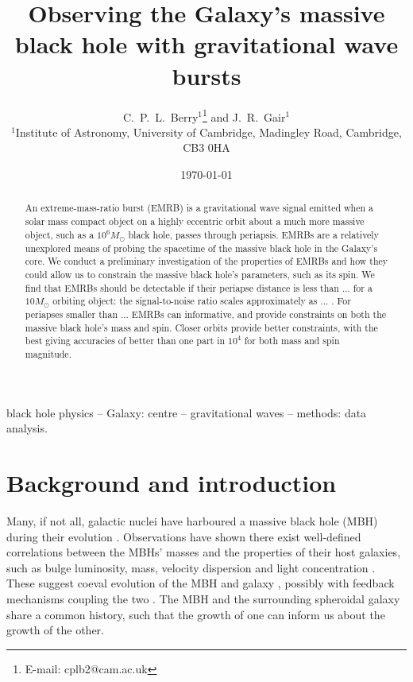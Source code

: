 \documentclass[useAMS,usedcolumn,usegraphicx,usenatbib]{mn2e}
\title[Observing the Galaxy's MBH with GW bursts]{Observing the Galaxy's massive black hole with gravitational wave bursts}
\author[C.\ P.\ L.\ Berry and J.\ R.\ Gair]{C.\ P.\ L.\ Berry$^{1}$\thanks{E-mail: cplb2@cam.ac.uk}  and J.\ R.\ Gair$^{1}$\\
$^{1}$Institute of Astronomy, University of Cambridge, Madingley Road, Cambridge, CB3 0HA}
\begin{document}
\date{\today}

\pagerange{\pageref{firstpage}--\pageref{lastpage}} 

\maketitle

\label{firstpage}

\begin{abstract}
An extreme-mass-ratio burst (EMRB) is a gravitational wave signal emitted when a solar mass compact object on a highly eccentric orbit about a much more massive object, such as a $10^6 M_\odot$ black hole, passes through periapsis. EMRBs are a relatively unexplored means of probing the spacetime of the massive black hole in the Galaxy's core. We conduct a preliminary investigation of the properties of EMRBs and how they could allow us to constrain the massive black hole's parameters, such as its spin. We find that EMRBs should be detectable if their periapse distance is less than ... for a $10 M_\odot$ orbiting object: the signal-to-noise ratio scales approximately as ... . For periapses smaller than ... EMRBs can informative, and provide constraints on both the massive black hole's mass and spin. Closer orbits provide better constraints, with the best giving accuracies of better than one part in $10^4$ for both mass and spin magnitude.
\end{abstract}

\begin{keywords}
black hole physics -- Galaxy: centre -- gravitational waves -- methods: data analysis.
\end{keywords}

\section{Background and introduction}\label{sec:Intro}

Many, if not all, galactic nuclei have harboured a massive black hole (MBH) during their evolution \citep{Lynden-Bell1971, Soltan1982, Rees1984}. Observations have shown there exist well-defined correlations between the MBHs' masses and the properties of their host galaxies, such as bulge luminosity, mass, velocity dispersion and light concentration \citep{Kormendy1995, Magorrian1998, Ferrarese2000, Gebhardt2000, Graham2001, Tremaine2002, Marconi2003, Haring2004, Graham2007, Graham2011}. These suggest coeval evolution of the MBH and galaxy \citep{Peng2007, Jahnke2011}, possibly with feedback mechanisms coupling the two \citep{Haiman2004, Volonteri2009}. The MBH and the surrounding spheroidal galaxy share a common history, such that the growth of one can inform us about the growth of the other.
\end{document}
